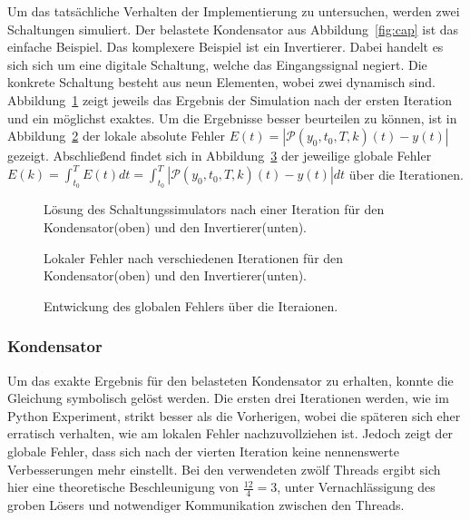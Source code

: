 Um das tatsächliche Verhalten der Implementierung zu untersuchen, werden zwei Schaltungen simuliert. Der belastete Kondensator aus Abbildung~\ref{fig:cap} ist das einfache Beispiel. Das komplexere Beispiel ist ein Invertierer. Dabei handelt es sich sich um eine digitale Schaltung, welche das Eingangssignal negiert. Die konkrete Schaltung besteht aus neun Elementen, wobei zwei dynamisch sind. Abbildung~\ref{fig:sol_sim} zeigt jeweils das Ergebnis der Simulation nach der ersten Iteration und ein möglichst exaktes. Um die Ergebnisse besser beurteilen zu können, ist in Abbildung~\ref{fig:error_local_sim} der lokale absolute Fehler \(E(t) = \left|\mathcal{P}(y_0,t_0,T,k)(t)-y(t)\right|\) gezeigt. Abschließend findet sich in Abbildung~\ref{fig:error_global_sim} der jeweilige globale Fehler \(E(k) = \int_{t_0}^{T}E(t) dt = \int_{t_0}^{T}\left|\mathcal{P}(y_0,t_0,T,k)(t)-y(t)\right| dt\) über die Iterationen.

\begin{figure}[ht]
    \centering
        
        
    \caption{Lösung des Schaltungssimulators nach einer Iteration für den Kondensator(oben) und den Invertierer(unten).}
    \label{fig:sol_sim}
\end{figure}
\begin{figure}[ht]
    \centering
        
        
    \caption{Lokaler Fehler nach verschiedenen Iterationen für den Kondensator(oben) und den Invertierer(unten).}
    \label{fig:error_local_sim}
\end{figure}
\begin{figure}[ht]
    \centering
        
        
    \caption{Entwickung des globalen Fehlers über die Iteraionen.}
    \label{fig:error_global_sim}
\end{figure}

\subsubsection*{Kondensator}
Um das exakte Ergebnis für den belasteten Kondensator zu erhalten, konnte die Gleichung symbolisch gelöst werden. Die ersten drei Iterationen werden, wie im Python Experiment, strikt besser als die Vorherigen, wobei die späteren sich eher erratisch verhalten, wie am lokalen Fehler nachzuvollziehen ist. Jedoch zeigt der globale Fehler, dass sich nach der vierten Iteration keine nennenswerte Verbesserungen mehr einstellt. Bei den verwendeten zwölf Threads ergibt sich hier eine theoretische Beschleunigung von \(\frac{12}{4} = 3\), unter Vernachlässigung des groben Lösers und notwendiger Kommunikation zwischen den Threads.

